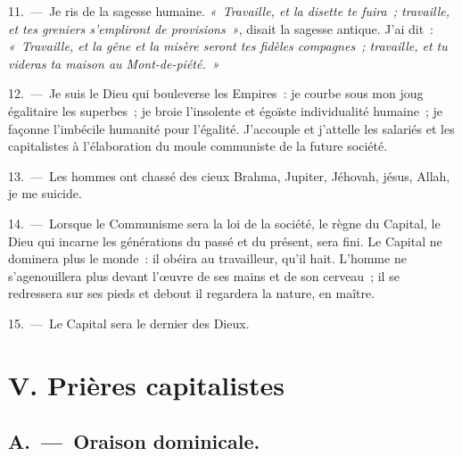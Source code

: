 \documentclass[french,twoside]{book} %
\newcommand\chapteropen{} %
\newcommand\chaptercont{} %
\newcommand\chapterclose{} %
\begin{document}
11. — Je ris de la sagesse humaine. \emph{« Travaille, et la disette te fuira ; travaille, et tes greniers s’empliront de provisions »}, disait la sagesse antique. J'ai dit : \emph{« Travaille, et la gêne et la misère seront tes fidèles compagnes ; travaille, et tu videras ta maison au Mont-de-piété. »}\par
12. — Je suis le Dieu qui bouleverse les Empires : je courbe sous mon joug égalitaire les superbes ; je broie l’insolente et égoïste individualité humaine ; je façonne l’imbécile humanité pour l’égalité. J'accouple et j’attelle les salariés et les capitalistes à l’élaboration du moule communiste de la future société.\par
13. — Les hommes ont chassé des cieux Brahma, Jupiter, Jéhovah, jésus, Allah, je me suicide.\par
14. — Lorsque le Communisme sera la loi de la société, le règne du Capital, le Dieu qui incarne les générations du passé et du présent, sera fini. Le Capital ne dominera plus le monde : il obéira au travailleur, qu’il hait. L'homme ne s’agenouillera plus devant l’œuvre de ses mains et de son cerveau ; il se redressera sur ses pieds et debout il regardera la nature, en maître.\par
15. — Le Capital sera le dernier des Dieux.
\chapterclose


\chapteropen

\chapter[{V. Prières capitalistes}]{V. Prières capitalistes}
\renewcommand{\leftmark}{V. Prières capitalistes}


\chaptercont

\section[{A. — Oraison dominicale.}]{A. — Oraison dominicale.}
\end{document}
